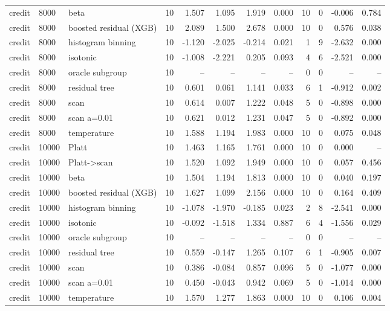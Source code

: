 \begin{tabular}{lllrrrrrrrrr}
credit & 8000 & beta & 10 & 1.507 & 1.095 & 1.919 & 0.000 & 10 & 0 & -0.006 & 0.784 \\
credit & 8000 & boosted residual (XGB) & 10 & 2.089 & 1.500 & 2.678 & 0.000 & 10 & 0 & 0.576 & 0.038 \\
credit & 8000 & histogram binning & 10 & -1.120 & -2.025 & -0.214 & 0.021 & 1 & 9 & -2.632 & 0.000 \\
credit & 8000 & isotonic & 10 & -1.008 & -2.221 & 0.205 & 0.093 & 4 & 6 & -2.521 & 0.000 \\
credit & 8000 & oracle subgroup & 10 & -- & -- & -- & -- & 0 & 0 & -- & -- \\
credit & 8000 & residual tree & 10 & 0.601 & 0.061 & 1.141 & 0.033 & 6 & 1 & -0.912 & 0.002 \\
credit & 8000 & scan & 10 & 0.614 & 0.007 & 1.222 & 0.048 & 5 & 0 & -0.898 & 0.000 \\
credit & 8000 & scan a=0.01 & 10 & 0.621 & 0.012 & 1.231 & 0.047 & 5 & 0 & -0.892 & 0.000 \\
credit & 8000 & temperature & 10 & 1.588 & 1.194 & 1.983 & 0.000 & 10 & 0 & 0.075 & 0.048 \\
credit & 10000 & Platt & 10 & 1.463 & 1.165 & 1.761 & 0.000 & 10 & 0 & 0.000 & -- \\
credit & 10000 & Platt->scan & 10 & 1.520 & 1.092 & 1.949 & 0.000 & 10 & 0 & 0.057 & 0.456 \\
credit & 10000 & beta & 10 & 1.504 & 1.194 & 1.813 & 0.000 & 10 & 0 & 0.040 & 0.197 \\
credit & 10000 & boosted residual (XGB) & 10 & 1.627 & 1.099 & 2.156 & 0.000 & 10 & 0 & 0.164 & 0.409 \\
credit & 10000 & histogram binning & 10 & -1.078 & -1.970 & -0.185 & 0.023 & 2 & 8 & -2.541 & 0.000 \\
credit & 10000 & isotonic & 10 & -0.092 & -1.518 & 1.334 & 0.887 & 6 & 4 & -1.556 & 0.029 \\
credit & 10000 & oracle subgroup & 10 & -- & -- & -- & -- & 0 & 0 & -- & -- \\
credit & 10000 & residual tree & 10 & 0.559 & -0.147 & 1.265 & 0.107 & 6 & 1 & -0.905 & 0.007 \\
credit & 10000 & scan & 10 & 0.386 & -0.084 & 0.857 & 0.096 & 5 & 0 & -1.077 & 0.000 \\
credit & 10000 & scan a=0.01 & 10 & 0.450 & -0.043 & 0.942 & 0.069 & 5 & 0 & -1.014 & 0.000 \\
credit & 10000 & temperature & 10 & 1.570 & 1.277 & 1.863 & 0.000 & 10 & 0 & 0.106 & 0.004 \\

\end{tabular}

